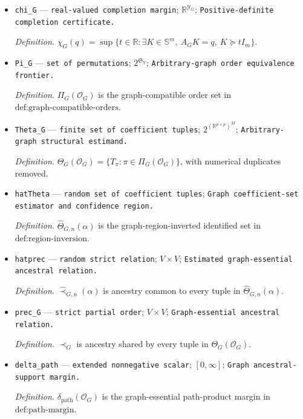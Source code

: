 \documentclass{article}
\begin{document}
\begin{itemize}
  \item \texttt{chi\_\allowbreak{}G} --- \texttt{real-\allowbreak{}valued completion margin}; \(\mathbb R^{\mathcal Y_G}\); \texttt{Positive-\allowbreak{}definite completion certificate.}
  \par\smallskip\noindent\emph{Definition.} \(\chi_G(q)=\sup\{t\in\mathbb R:\exists K\in\mathbb S^m,\ A_GK=q,\ K\succeq tI_m\}\).
  \item \texttt{Pi\_\allowbreak{}G} --- \texttt{set of permutations}; \(2^{\mathfrak S_V}\); \texttt{Arbitrary-\allowbreak{}graph order equivalence frontier.}
  \par\smallskip\noindent\emph{Definition.} \(\Pi_G(\mathcal O_G)\) is the graph-compatible order set in \(\text{def:graph-compatible-orders}\).
  \item \texttt{Theta\_\allowbreak{}G} --- \texttt{finite set of coefficient tuples}; \(2^{(\mathbb R^{p\times p})^M}\); \texttt{Arbitrary-\allowbreak{}graph structural estimand.}
  \par\smallskip\noindent\emph{Definition.} \(\Theta_G(\mathcal O_G)=\{T_\pi:\pi\in\Pi_G(\mathcal O_G)\}\), with numerical duplicates removed.
  \item \texttt{hatTheta} --- \texttt{random set of coefficient tuples}; \texttt{Graph coefficient-\allowbreak{}set estimator and confidence region.}
  \par\smallskip\noindent\emph{Definition.} \(\widehat\Theta_{G,n}(\alpha)\) is the graph-region-inverted identified set in \(\text{def:region-inversion}\).
  \item \texttt{hatprec} --- \texttt{random strict relation}; \(V\times V\); \texttt{Estimated graph-\allowbreak{}essential ancestral relation.}
  \par\smallskip\noindent\emph{Definition.} \(\widehat\prec_{G,n}(\alpha)\) is ancestry common to every tuple in \(\widehat\Theta_{G,n}(\alpha)\).
  \item \texttt{prec\_\allowbreak{}G} --- \texttt{strict partial order}; \(V\times V\); \texttt{Graph-\allowbreak{}essential ancestral relation.}
  \par\smallskip\noindent\emph{Definition.} \(\prec_G\) is ancestry shared by every tuple in \(\Theta_G(\mathcal O_G)\).
  \item \texttt{delta\_\allowbreak{}path} --- \texttt{extended nonnegative scalar}; \([0,\infty]\); \texttt{Graph ancestral-\allowbreak{}support margin.}
  \par\smallskip\noindent\emph{Definition.} \(\delta_{\mathrm{path}}(\mathcal O_G)\) is the graph-essential path-product margin in \(\text{def:path-margin}\).

\end{itemize}
\end{document}
